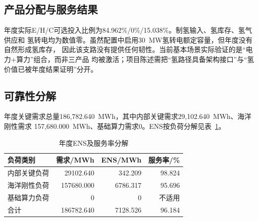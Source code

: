 \subsection{产品分配与服务结果}

\begin{table}[htbp]
\centering
\caption{年度在线策略核心结果}
\label{tab:c5-annual-summary}
\end{table}

年度实际E/H/C可选投入比例为84.962\%/0\%/15.038\%。制氢输入、氢库存、氢气供应和
氢转电均为数值零。虽然配置中启用30~MW氢转电额定容量，但年度没有自然形成氢库存，
因此该支路没有提供任何韧性。当前基本场景实际验证的是“电力+算力”组合，而非三产品
均被激活；项目陈述需把“氢路径具备架构接口”与“氢价值已被年度结果证明”分开。

\subsection{可靠性分解}

年度关键需求总量186,782.640~MWh，其中内部关键需求29,102.640~MWh、海洋刚性需求
157,680.000~MWh、基础算力需求0。ENS按负荷分解见表~\ref{tab:c5-annual-reliability}。

\begin{table}[htbp]
\centering
\caption{年度ENS及服务率分解}
\label{tab:c5-annual-reliability}
\begin{tabular}{lrrr}
\toprule
负荷类别 & 需求/MWh & ENS/MWh & 服务率/\%\\
\midrule
内部关键负荷 & 29102.640 & 342.209 & 98.824\\
海洋刚性负荷 & 157680.000 & 6786.317 & 95.696\\
基础算力负荷 & 0 & 0 & 不适用\\
合计 & 186782.640 & 7128.526 & 96.184\\
\bottomrule
\end{tabular}
\end{table}

